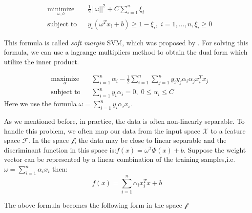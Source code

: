  \begin{equation}\label{eq:svm_optimization_margin}
 \begin{aligned}
 & \underset{\omega,b}{\text{minimize}}
 & &\frac{1}{2}||\omega||^2+C\sum_{i=1}^{n}\xi_i\\
 & \text{subject to}
 & & y_i(\omega^Tx_i+b)\geq 1-\xi_i, \; i = 1, \ldots, n,\xi_i\geq 0
 \end{aligned}
 \end{equation}
 
This formula is called \textit{soft margin} SVM, which was proposed by \cite{cortes1995support}. For solving this formula, we can use a lagrange multipliers method to obtain the dual form which utilize the inner product.

\begin{equation}
\begin{aligned}
& \underset{\alpha}{\text{maximize}}
& &\sum_{i=1}^{n}\alpha_i -\frac{1}{2}\sum_{i=1}^{n}\sum_{j=1}^{n}y_iy_j\alpha_i\alpha_jx_i^Tx_j\\
& \text{subject to}
& & \sum_{i=1}^{n}y_i\alpha_i=0,\; 0\leq\alpha_i\leq C
\end{aligned}
\end{equation}   
Here we use the formula $\omega=\sum_{i=1}^{n}y_i\alpha_ix_i$. 

As we mentioned before, in practice, the data is often non-linearly separable. To handle this problem, we often map our data from the input space $\mathcal{X}$ to a feature space $\mathcal{F}$. In the space $\mathcal{f}$, the data may be close to linear separable and the discriminant function in this space is:$f(x)=\omega^T\Phi(x)+b$. Suppose the weight vector can be represented by a linear combination of the training samples,i.e. $\omega=\sum_{i=1}^{n}\alpha_ix_i$
then:
\begin{equation}
f(x)=\sum_{i=1}^{n}\alpha_ix_i^Tx +b
\end{equation}

The above formula becomes the following form in the space $\mathcal{f}$

